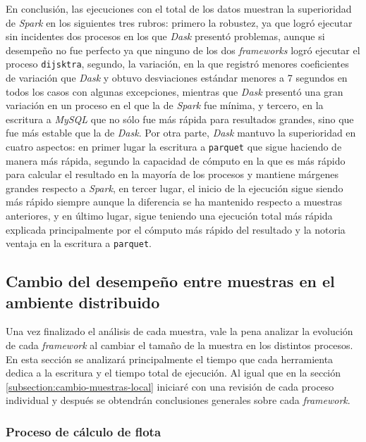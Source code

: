 En conclusión, las ejecuciones con el total de los datos muestran la superioridad de \textit{Spark} en los siguientes tres rubros: primero la robustez, ya que logró ejecutar sin incidentes dos procesos en los que \textit{Dask} presentó problemas, aunque si desempeño no fue perfecto ya que ninguno de los dos \textit{frameworks} logró ejecutar el proceso \texttt{dijsktra}, segundo, la variación, en la que registró menores coeficientes de variación que \textit{Dask} y obtuvo desviaciones estándar menores a 7 segundos en todos los casos con algunas excepciones, mientras que \textit{Dask} presentó una gran variación en un proceso en el que la de \textit{Spark} fue mínima, y tercero, en la escritura a \textit{MySQL} que no sólo fue más rápida para resultados grandes, sino que fue más estable que la de \textit{Dask}. Por otra parte, \textit{Dask} mantuvo la superioridad en cuatro aspectos: en primer lugar la escritura a \texttt{parquet} que sigue haciendo de manera más rápida, segundo la capacidad de cómputo en la que es más rápido para calcular el resultado en la mayoría de los procesos y mantiene márgenes grandes respecto a \textit{Spark}, en tercer lugar, el inicio de la ejecución sigue siendo más rápido siempre aunque la diferencia se ha mantenido respecto a muestras anteriores, y en último lugar, sigue teniendo una ejecución total más rápida explicada principalmente por el cómputo más rápido del resultado y la notoria ventaja en la escritura a \texttt{parquet}.



\subsection{Cambio del desempeño entre muestras en el ambiente distribuido}

Una vez finalizado el análisis de cada muestra, vale la pena analizar la evolución de cada \textit{framework} al cambiar el tamaño de la muestra en los distintos procesos. En esta sección se analizará principalmente el tiempo que cada herramienta dedica a la escritura y el tiempo total de ejecución. Al igual que en la sección \ref{subsection:cambio-muestras-local} iniciaré con una revisión de cada proceso individual y después se obtendrán conclusiones generales sobre cada \textit{framework}.

\subsubsection{Proceso de cálculo de flota}


